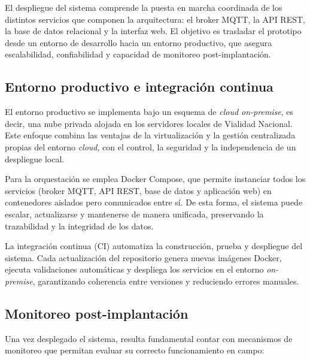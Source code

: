 El despliegue del sistema comprende la puesta en marcha coordinada de los distintos servicios que componen la arquitectura: el broker MQTT, la API REST, la base de datos relacional y la interfaz web.  
El objetivo es trasladar el prototipo desde un entorno de desarrollo hacia un entorno productivo, que asegura escalabilidad, confiabilidad y capacidad de monitoreo post-implantación.  

\subsection{Entorno productivo e integración continua}

El entorno productivo se implementa bajo un esquema de \textit{cloud on-premise}, es decir, una nube privada alojada en los servidores locales de Vialidad Nacional. 
Este enfoque combina las ventajas de la virtualización y la gestión centralizada propias del entorno \textit{cloud}, con el control, la seguridad y la independencia de un despliegue local.

Para la orquestación se emplea Docker Compose, que permite instanciar todos los servicios (broker MQTT, API REST, base de datos y aplicación web) en contenedores aislados pero comunicados entre sí. 
De esta forma, el sistema puede escalar, actualizarse y mantenerse de manera unificada, preservando la trazabilidad y la integridad de los datos.

La integración continua (CI) automatiza la construcción, prueba y despliegue del sistema. 
Cada actualización del repositorio genera nuevas imágenes Docker, ejecuta validaciones automáticas y despliega los servicios en el entorno \textit{on-premise}, garantizando coherencia entre versiones y reduciendo errores manuales.

\subsection{Monitoreo post-implantación}

Una vez desplegado el sistema, resulta fundamental contar con mecanismos de monitoreo que permitan evaluar su correcto funcionamiento en campo:  

